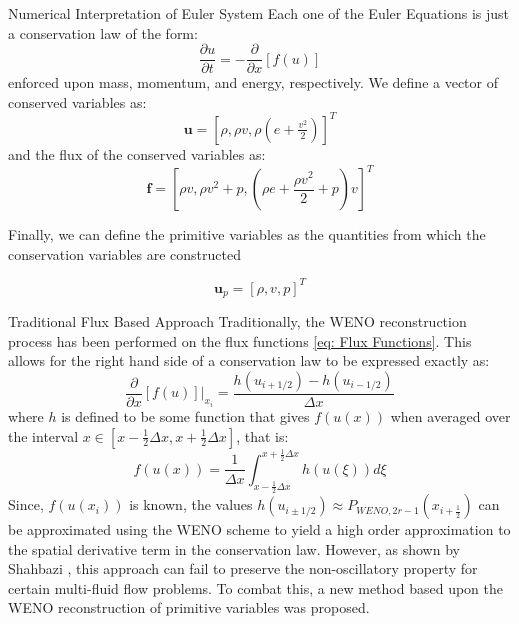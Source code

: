 \documentclass[9pt]{beamer}
\begin{document}

\begin{frame}{Numerical Interpretation of Euler System}
Each one of the Euler Equations is just a conservation law of the form:
\begin{equation}
	\frac{\partial u}{\partial t}=-\frac{\partial}{\partial x}[f(u)]\label{eq:ConservationLaw}
\end{equation}
 enforced upon mass, momentum, and energy, respectively. We define a vector of conserved variables as: $$\textbf{u}=[\rho,\rho v,\rho(e+\tfrac{v^2}{2})]^T$$ and the flux of the conserved variables as:
\begin{equation}
	\textbf{f} = [\rho v, \rho v^2 + p, (\rho e +\frac{\rho v^2}{2}+p)v]^T\label{eq: Flux Functions}
\end{equation}

Finally, we can define the primitive variables as the quantities from which the conservation variables are constructed

\begin{equation}
\textbf{u}_p=[\rho,v,p]^T
\end{equation}

\end{frame}




\begin{frame}{Traditional Flux Based Approach}
Traditionally, the WENO reconstruction process has been performed on the flux functions \eqref{eq: Flux Functions}.  This allows for the right hand side of a conservation law to be expressed exactly as:
\begin{equation}
\frac{\partial}{\partial	x}[f(u)]\bigg|_{x_i}=\frac{h(u_{i+1/2}) - h(u_{i-1/2})}{\Delta x} \label{eq: Traditional Derivative}
\end{equation}
where $h$ is defined to be some function that gives $f(u(x))$ when averaged over the interval $x\in[x-\frac{1}{2}\Delta x, x+\frac{1}{2}\Delta x]$, that is:
\begin{equation}
f(u(x))=\frac{1}{\Delta x} \int_{x-\frac{1}{2}\Delta x}^{x+\frac{1}{2}\Delta x}h(u(\xi))d\xi
\end{equation}
Since, $f(u(x_i))$ is known, the values $h(u_{i\pm1/2})\approx P_{WENO, 2r-1}(x_{i+\frac{1}{2}})$ can be approximated using the WENO scheme to yield a high order approximation to the spatial derivative term in the conservation law.  However, as shown by Shahbazi \cite{Shahbazi}, this approach can fail to preserve the non-oscillatory property for certain multi-fluid flow problems.  To combat this, a new method based upon the WENO reconstruction of primitive variables was proposed.
\end{frame}
\end{document}
